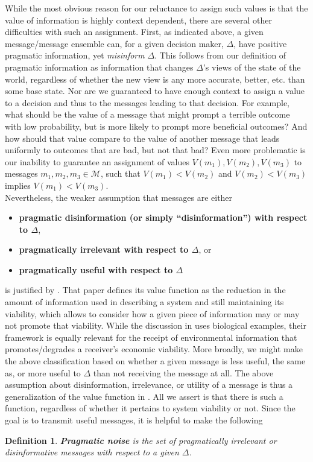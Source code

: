 \documentclass[11pt]{article}
\newtheorem*{definition}{Definition}
\begin{document}
While the most obvious reason for our reluctance to assign such values is that the value of information is highly context dependent, there are 
several other difficulties with such an assignment.  First, as indicated above, a given message/message ensemble can, 
for a given decision maker, $\Delta$, have positive pragmatic information, yet {\it misinform} $\Delta$.  This follows from our definition of
pragmatic information as information that changes $\Delta$'s views of the state of the world, regardless of whether the new view is any more accurate, better, etc. than some base state.  Nor 
are we guaranteed to have enough context to assign a value to a decision and thus to the messages leading to that decision.  For example, what should be the value of a message
that might prompt a terrible outcome with low probability, but is more likely to prompt more beneficial outcomes?  And how should that value compare to the value of another message that leads uniformly to 
outcomes that are bad, but not that bad?  Even more problematic is our inability to guarantee an assignment of values
$V(m_1), V(m_2), V(m_3)$ to messages $m_1, m_2, m_3 \in \mathcal M$, such that $V(m_1) < V(m_2)$ and $V(m_2) < V(m_3)$ implies $V(m_1) < V(m_3)$.\\
 
Nevertheless, the weaker assumption that messages are either 
\begin{itemize}
\item {\bf pragmatic disinformation (or simply ``disinformation'') with respect to $\Delta$}, 
\item {\bf pragmatically irrelevant with respect to $\Delta$}, or 
\item {\bf pragmatically useful with respect to $\Delta$}
\end{itemize}
is justified by \cite{Wolpert}.  That paper defines its value function 
as the reduction in the amount of information used in describing a system and still maintaining its viability, 
which allows \cite{Wolpert} to consider how a given piece of information may or may not promote 
that viability.   While the discussion in \cite{Wolpert} uses biological examples, their framework is equally relevant for the 
receipt of environmental information that promotes/degrades a receiver's economic 
viability.  More broadly, we might make the above classification based on whether a given message is less useful, the same 
as, or more useful to $\Delta$ than not receiving the message at all.  The above assumption about 
disinformation, irrelevance, or utility of a message is thus a generalization of the value function in 
\cite{Wolpert}.  All we assert is that there is such a function, regardless of whether it pertains to system viability or not.  Since the goal is to transmit useful 
messages, it is helpful to make the following   
\begin{definition}
{\bf Pragmatic noise} is the set of pragmatically irrelevant or disinformative messages with respect to a given $\Delta$.
\end{definition}
\end{document}
